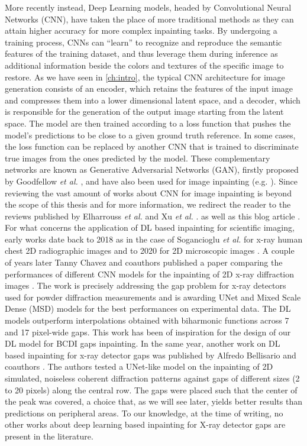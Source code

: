 More recently instead, Deep Learning models, headed by Convolutional Neural Networks (CNN), have taken the place of more traditional 
methods as they can attain higher accuracy for more complex inpainting tasks. By undergoing a  
training process, CNNs can ``learn'' to recognize and reproduce the semantic features of the training dataset, and thus
leverage them during inference as additional information beside the colors and textures of the specific image to restore. 
As we have seen in \ref{ch:intro}, the typical CNN architecture for image generation consists of an encoder, which
retains the features of the input image and compresses them into a lower dimensional latent space, and a decoder, which
is responsible for the generation of the output image starting from the latent space. The model are then trained according 
to a loss function that pushes the model's predictions to be close to a given ground truth reference. 
In some cases, the loss function can be replaced by another CNN that is trained to discriminate true images from the ones
predicted by the model. These complementary networks are known as Generative Adversarial Networks (GAN), firstly 
proposed by Goodfellow \textit{et al.} \cite{goodfellow2014generativeadversarialnetworks}, and have also been used for 
image inpainting (e.g. \cite{gan_inpainting}). 
Since reviewing the vast amount of works about CNN for image inpainting is beyond the scope of this thesis and for more 
information, we redirect the reader to the reviews published by Elharrouss \textit{et al.} and Xu \textit{et al.} \cite{reviewInpainting2021,reviewInpaintingDL2023}.
as well as this blog article \cite{towardsdatascience_inpainting}. For what concerns the application of DL based 
inpainting for scientific imaging, early works date back to 2018 as in the case of Sogancioglu \textit{et al.} for x-ray 
human chest 2D radiographic images \cite{sogancioglu2018chestxrayinpaintingdeep} and to 2020 for 2D microscopic images \cite{microscopic_inpainting_2020}.
A couple of years later Tanny Chavez and coauthors published a paper comparing the performances of different CNN models 
for the inpainting of 2D x-ray diffraction images \cite{chavez_comparison_2022}. The work is precisely addressing the 
gap problem for x-ray detectors used for powder diffraction measurements and is awarding UNet and Mixed Scale Dense (MSD) 
models for the best performances on experimental data. The DL models outperform interpolations obtained with biharmonic functions
across 7 and 17 pixel-wide gaps. This work has been of inspiration for the design of our DL model for BCDI gaps inpainting.
In the same year, another work on DL based inpainting for x-ray detector gaps was published by Alfredo Bellisario 
and coauthors \cite{bellisario_noise_2022}. The authors tested a UNet-like model on the inpainting of 2D simulated, noiseless
coherent diffraction patterns against gaps of different sizes (2 to 20 pixels) along the central row. The gaps were 
placed such that the center of the peak was covered, a choice that, as we will see later, yields better results than 
predictions on peripheral areas. To our knowledge, at the time of writing, no other works about deep learning based inpainting
for X-ray detector gaps are present in the literature. \\

